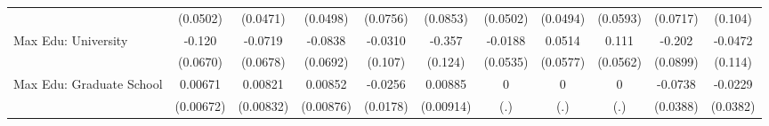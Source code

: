 {\begin{tabular}{l*{10}{c}}
            &    (0.0502)         &    (0.0471)         &    (0.0498)         &    (0.0756)         &    (0.0853)         &    (0.0502)         &    (0.0494)         &    (0.0593)         &    (0.0717)         &     (0.104)         \\
\addlinespace
Max Edu: University&      -0.120         &     -0.0719         &     -0.0838         &     -0.0310         &      -0.357\sym{**} &     -0.0188         &      0.0514         &       0.111\sym{*}  &      -0.202\sym{*}  &     -0.0472         \\
            &    (0.0670)         &    (0.0678)         &    (0.0692)         &     (0.107)         &     (0.124)         &    (0.0535)         &    (0.0577)         &    (0.0562)         &    (0.0899)         &     (0.114)         \\
\addlinespace
Max Edu: Graduate School&     0.00671         &     0.00821         &     0.00852         &     -0.0256         &     0.00885         &           0         &           0         &           0         &     -0.0738         &     -0.0229         \\
            &   (0.00672)         &   (0.00832)         &   (0.00876)         &    (0.0178)         &   (0.00914)         &         (.)         &         (.)         &         (.)         &    (0.0388)         &    (0.0382)         \\
\bottomrule
\end{tabular}
}
